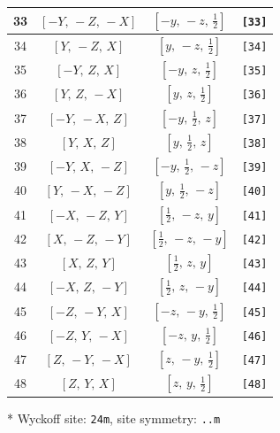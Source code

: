 \documentclass[fleqn,8pt]{jsarticle}
\begin{document}
\begin{longtable}{cccc}
33 & $\left[ - Y,\, - Z,\, - X \right]$ & $\left[ - y,\, - z,\, \frac{1}{2} \right]$ & {\tt [33]} \\ \hline
34 & $\left[ Y,\, - Z,\, X \right]$ & $\left[ y,\, - z,\, \frac{1}{2} \right]$ & {\tt [34]} \\ \hline
35 & $\left[ - Y,\, Z,\, X \right]$ & $\left[ - y,\, z,\, \frac{1}{2} \right]$ & {\tt [35]} \\ \hline
36 & $\left[ Y,\, Z,\, - X \right]$ & $\left[ y,\, z,\, \frac{1}{2} \right]$ & {\tt [36]} \\ \hline
37 & $\left[ - Y,\, - X,\, Z \right]$ & $\left[ - y,\, \frac{1}{2},\, z \right]$ & {\tt [37]} \\ \hline
38 & $\left[ Y,\, X,\, Z \right]$ & $\left[ y,\, \frac{1}{2},\, z \right]$ & {\tt [38]} \\ \hline
39 & $\left[ - Y,\, X,\, - Z \right]$ & $\left[ - y,\, \frac{1}{2},\, - z \right]$ & {\tt [39]} \\ \hline
40 & $\left[ Y,\, - X,\, - Z \right]$ & $\left[ y,\, \frac{1}{2},\, - z \right]$ & {\tt [40]} \\ \hline
41 & $\left[ - X,\, - Z,\, Y \right]$ & $\left[ \frac{1}{2},\, - z,\, y \right]$ & {\tt [41]} \\ \hline
42 & $\left[ X,\, - Z,\, - Y \right]$ & $\left[ \frac{1}{2},\, - z,\, - y \right]$ & {\tt [42]} \\ \hline
43 & $\left[ X,\, Z,\, Y \right]$ & $\left[ \frac{1}{2},\, z,\, y \right]$ & {\tt [43]} \\ \hline
44 & $\left[ - X,\, Z,\, - Y \right]$ & $\left[ \frac{1}{2},\, z,\, - y \right]$ & {\tt [44]} \\ \hline
45 & $\left[ - Z,\, - Y,\, X \right]$ & $\left[ - z,\, - y,\, \frac{1}{2} \right]$ & {\tt [45]} \\ \hline
46 & $\left[ - Z,\, Y,\, - X \right]$ & $\left[ - z,\, y,\, \frac{1}{2} \right]$ & {\tt [46]} \\ \hline
47 & $\left[ Z,\, - Y,\, - X \right]$ & $\left[ z,\, - y,\, \frac{1}{2} \right]$ & {\tt [47]} \\ \hline
48 & $\left[ Z,\, Y,\, X \right]$ & $\left[ z,\, y,\, \frac{1}{2} \right]$ & {\tt [48]} \\
\end{longtable}
* Wyckoff site: {\tt 24m}, site symmetry: {\tt ..m}
\renewcommand{\arraystretch}{1.2}
\end{document}
